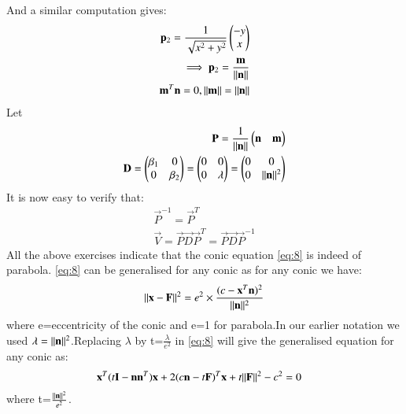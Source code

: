 \documentclass[journal,12pt,twocolumn]{IEEEtran}
\begin{document}
And a similar computation gives:
\begin{align}
\mathbf{p}_{2}=\frac{1}{\sqrt{x^2+y^2}}\begin{pmatrix}-y\\x\end{pmatrix}\\
\implies\mathbf{p}_{2}=\frac{\mathbf{m}}{\Vert\mathbf{n}\rVert}\\
\mathbf{m}^T\mathbf{n}=0, \Vert\mathbf{m}\rVert=\Vert\mathbf{n}\rVert
\end{align}
Let
\begin{align}
\mathbf{P}=\frac{1}{\Vert\mathbf{n}\rVert}\begin{pmatrix}\mathbf{n}&\mathbf{m}\end{pmatrix}\\
\mathbf{D}=\begin{pmatrix}\beta_{1}&0\\0&\beta_{2}\end{pmatrix}=\begin{pmatrix}0&0\\0&\lambda\end{pmatrix}=\begin{pmatrix}0&0\\0&\Vert\mathbf{n}\rVert^2\end{pmatrix}
\end{align}
It is now easy to verify that:
\begin{align}
\vec{P}^{-1}=\vec{P}^T\\
\vec{V}=\vec{P}\vec{D}\vec{P}^T=\vec{P}\vec{D}\vec{P}^{-1}
\end{align}
All the above exercises indicate that the conic equation \eqref{eq:8} is indeed of parabola.
%
\eqref{eq:8} can be generalised for any conic as for any conic we have:
\begin{align}
\Vert\mathbf{x}-\mathbf{F}\rVert^2=e^2\times\frac{({c-\mathbf{x}^T\mathbf{n}})^2}{\Vert\mathbf{n}\rVert^2}
\end{align}
where e=eccentricity of the conic and e=1 for parabola.In our earlier notation we used $\lambda=\Vert\mathbf{n}\rVert^2$.Replacing $\lambda$ by t=$\frac{\lambda}{e^2}$ in \eqref{eq:8} will give the generalised equation for any conic as:
\begin{align}
\mathbf{x}^T(t\mathbf{I}-\mathbf{n}\mathbf{n}^T)\mathbf{x}+2(c\mathbf{n}-t\mathbf{F})^T\mathbf{x}+t\Vert\mathbf{F}\rVert^2-c^2&=0
\end{align}
where t=$\frac{\Vert\mathbf{n}\rVert^2}{e^2}$.
\end{document}
